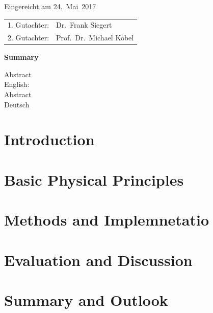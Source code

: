 \thispagestyle{empty}\vspace*{48em}

Eingereicht am 24.~Mai~2017\vspace{1.5em}
\par{\large\begin{tabular}{ll}
 1. Gutachter: & Dr.~Frank Siegert \\
 2. Gutachter: & Prof.~Dr.~Michael Kobel \\
\end{tabular}}


\newpage
\begin{center}\large\bfseries Summary\end{center}


Abstract \\ 
English: \\

\vspace{20em}
Abstract \\ 
Deutsch \\
 
 

\tableofcontents




\chapter{Introduction}

\chapter{Basic Physical Principles}


\chapter{Methods and Implemnetatio}

\chapter{Evaluation and Discussion}


\chapter{Summary and Outlook}


\printbibliography

